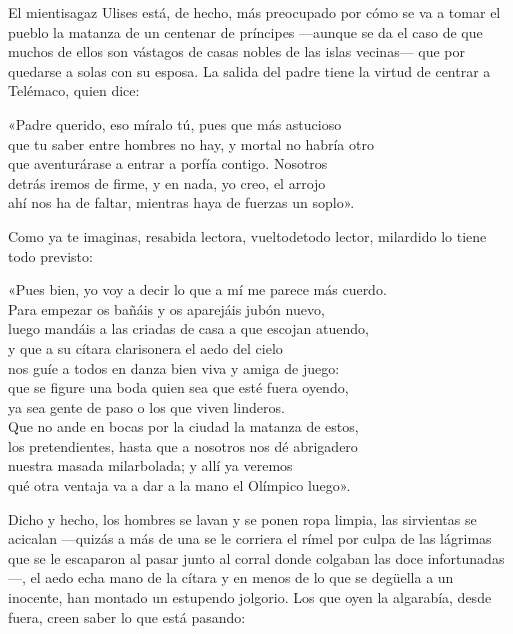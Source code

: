El mientisagaz Ulises está, de hecho, más preocupado por cómo se va a tomar el pueblo la matanza de un centenar de príncipes ---aunque se da el caso de que muchos de ellos son vástagos de casas nobles de las islas vecinas--- que por quedarse a solas con su esposa. La salida del padre tiene la virtud de centrar a Telémaco, quien dice:

\begin{versocita}
«Padre querido, eso míralo tú, pues que más astucioso\\
que tu saber entre hombres no hay, y mortal no habría otro\\
que aventurárase a entrar a porfía contigo. Nosotros\\
detrás iremos de firme, y en nada, yo creo, el arrojo\\
ahí nos ha de faltar, mientras haya de fuerzas un soplo».
\end{versocita}

Como ya te imaginas, resabida lectora, vueltodetodo lector, milardido lo tiene todo previsto:

\begin{versocita}
«Pues bien, yo voy a decir lo que a mí me parece más cuerdo.\\
Para empezar os bañáis y os aparejáis jubón nuevo,\\
luego mandáis a las criadas de casa a que escojan atuendo,\\
y que a su cítara clarisonera el aedo del cielo\\
nos guíe a todos en danza bien viva y amiga de juego:\\
que se figure una boda quien sea que esté fuera oyendo,\\
ya sea gente de paso o los que viven linderos.\\
Que no ande en bocas por la ciudad la matanza de estos,\\
los pretendientes, hasta que a nosotros nos dé abrigadero\\
nuestra masada milarbolada; y allí ya veremos\\
qué otra ventaja va a dar a la mano el Olímpico luego».
\end{versocita}

Dicho y hecho, los hombres se lavan y se ponen ropa limpia, las sirvientas se acicalan ---quizás a más de una se le corriera el rímel por culpa de las lágrimas que se le escaparon al pasar junto al corral donde colgaban las doce infortunadas---, el aedo echa mano de la cítara y en menos de lo que se degüella a un inocente, han montado un estupendo jolgorio. Los que oyen la algarabía, desde fuera, creen saber lo que está pasando:

